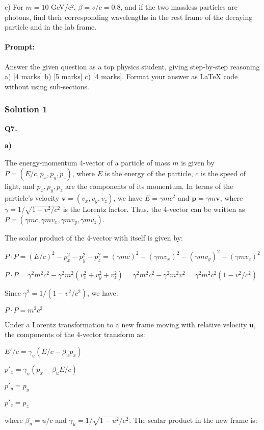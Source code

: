 \documentclass{article}
\begin{document}
c) For $m = 10$ GeV/c², $\beta = v/c = 0.8$, and if the two massless particles are photons, find their
corresponding wavelengths in the rest frame of the decaying particle and in the lab frame.


\paragraph{Prompt: \\} 
Answer the given question as a top physics student, giving step-by-step reasoning a) [4 marks] b) [5 marks] c) [4 marks]. Format your answer as LaTeX code without using sub-sections.

\subsubsection{Solution 1}
\textbf{Q7.}

\textbf{a)}

The energy-momentum 4-vector of a particle of mass $m$ is given by $P = (E/c, p_x, p_y, p_z)$, where $E$ is the energy of the particle, $c$ is the speed of light, and $p_x, p_y, p_z$ are the components of its momentum. In terms of the particle's velocity $\textbf{v} = (v_x, v_y, v_z)$, we have $E = \gamma m c^2$ and $\textbf{p} = \gamma m \textbf{v}$, where $\gamma = 1/\sqrt{1 - v^2/c^2}$ is the Lorentz factor. Thus, the 4-vector can be written as $P = (\gamma mc, \gamma m v_x, \gamma m v_y, \gamma m v_z)$.

The scalar product of the 4-vector with itself is given by:

$P \cdot P = (E/c)^2 - p_x^2 - p_y^2 - p_z^2 = (\gamma m c)^2 - (\gamma m v_x)^2 - (\gamma m v_y)^2 - (\gamma m v_z)^2$

$P \cdot P = \gamma^2 m^2 c^2 - \gamma^2 m^2 (v_x^2 + v_y^2 + v_z^2) = \gamma^2 m^2 c^2 - \gamma^2 m^2 v^2 = \gamma^2 m^2 c^2 (1 - v^2/c^2)$

Since $\gamma^2 = 1/(1 - v^2/c^2)$, we have:

$P \cdot P = m^2 c^2$

Under a Lorentz transformation to a new frame moving with relative velocity $\textbf{u}$, the components of the 4-vector transform as:

$E'/c = \gamma_u (E/c - \beta_u p_x)$

$p'_x = \gamma_u (p_x - \beta_u E/c)$

$p'_y = p_y$

$p'_z = p_z$

where $\beta_u = u/c$ and $\gamma_u = 1/\sqrt{1 - u^2/c^2}$. The scalar product in the new frame is:
\end{document}
